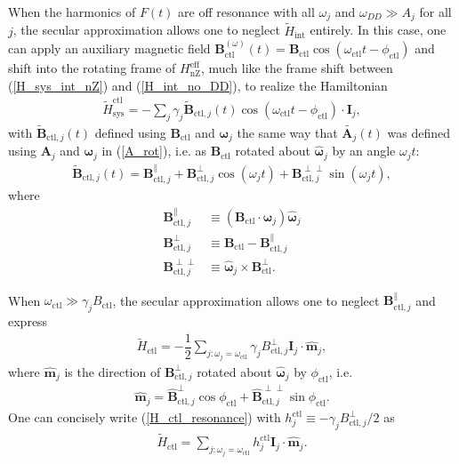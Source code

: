 \documentclass[twocolumn]{revtex4}
\renewcommand{\t}{\text} %
\newcommand{\f}[2]{\dfrac{#1}{#2}} %
\newcommand{\p}[1]{\left(#1\right)} %
\renewcommand{\v}{\bm} %
\newcommand{\uv}[1]{\hat{\v{#1}}} %
\renewcommand{\c}{\cdot} %
\begin{document}
When the harmonics of $F\p{t}$ are off resonance with all $\omega_j$
and $\omega_{DD}\gg A_j$ for all $j$, the secular approximation allows
one to neglect $\tilde H_\t{int}$ entirely. In this case, one can
apply an auxiliary magnetic field
$\v B_\t{ctl}^{\p\omega}\p{t}=\v
B_\t{ctl}\cos\p{\omega_\t{ctl}t-\phi_\t{ctl}}$ and shift into the
rotating frame of $H_\t{nZ}^\t{eff}$, much like the frame shift
between (\ref{H_sys_int_nZ}) and (\ref{H_int_no_DD}), to realize the
Hamiltonian
\begin{align}
  \tilde H_\t{sys}^\t{ctl} =
  -\sum_j\gamma_j\tilde{\v B}_{\t{ctl},j}\p{t}
  \cos\p{\omega_\t{ctl}t-\phi_\t{ctl}}\c\v I_j,
\end{align}
with $\tilde{\v B}_{\t{ctl},j}\p{t}$ defined using $\v B_\t{ctl}$ and
$\v\omega_j$ the same way that $\tilde{\v A_j}\p{t}$ was defined using
$\v A_j$ and $\v\omega_j$ in (\ref{A_rot}), i.e. as $\v B_\t{ctl}$
rotated about $\uv\omega_j$ by an angle $\omega_jt$:
\begin{align}
  \tilde{\v B}_{\t{ctl},j}\p{t} = \v B_{\t{ctl},j}^\parallel
  + \v B_{\t{ctl},j}^\perp\cos\p{\omega_jt}
  + \v B_{\t{ctl},j}^{\perp\perp}\sin\p{\omega_jt},
\end{align}
where
\begin{align}
  \v B_{\t{ctl},j}^\parallel
  &\equiv \p{\v B_\t{ctl} \c\uv\omega_j}\uv\omega_j \\
  \v B_{\t{ctl},j}^\perp
  &\equiv \v B_\t{ctl} - \v B_{\t{ctl},j}^\parallel \\
  \v B_{\t{ctl},j}^{\perp\perp}
  &\equiv \uv\omega_j\times\v B_\t{ctl}^\perp.
\end{align}

When $\omega_\t{ctl}\gg\gamma_jB_\t{ctl}$, the secular approximation
allows one to neglect $\v B_{\t{ctl},j}^\parallel$ and express
\begin{align}
  \tilde H_\t{ctl} = -\f12\sum_{j:\omega_j=\omega_\t{ctl}}
  \gamma_jB_{\t{ctl},j}^\perp \v I_j\c\uv m_j,
  \label{H_ctl_resonance}
\end{align}
where $\uv m_j$ is the direction of $\v B_{\t{ctl},j}^\perp$ rotated
about $\uv\omega_j$ by $\phi_\t{ctl}$, i.e.
\begin{align}
  \uv m_j = \uv B_{\t{ctl},j}^\perp\cos\phi_\t{ctl} +
  \uv B_{\t{ctl},j}^{\perp\perp}\sin\phi_\t{ctl}.
\end{align}
One can concisely write (\ref{H_ctl_resonance}) with
$h_j^\t{ctl}\equiv-\gamma_jB_{\t{ctl},j}^\perp/2$ as
\begin{align}
  \tilde H_\t{ctl} = \sum_{j:\omega_j=\omega_\t{ctl}}
  h_j^\t{ctl}\v I_j\c\uv m_j.
  \label{H_ctl}
\end{align}
\end{document}
